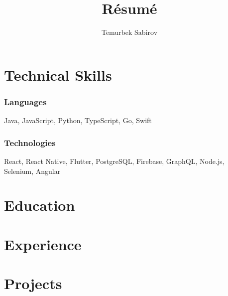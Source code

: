 \documentclass{article}
\begin{document}
\title{R\'esum\'e}
\author{Temurbek Sabirov}

\maketitle

\section{Technical Skills}
\subsubsection{Languages}
Java, JavaScript, Python, TypeScript, Go, Swift
\subsubsection{Technologies}
React, React Native, Flutter, PostgreSQL, Firebase, GraphQL, Node.js, Selenium, Angular
\section{Education}
\subsection{}
\section{Experience}
\section{Projects}
\end{document}
